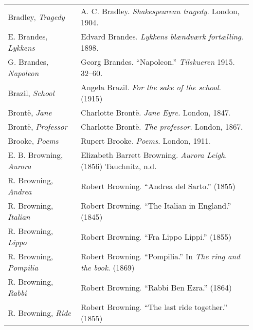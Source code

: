 \begin{longtable}{p{} p{}}
Bradley, \textit{Tragedy} & A. C. Bradley. \textit{Shakespearean tragedy}. London, 1904. \\

E. Brandes, \textit{Lykkens} & Edvard Brandes. \textit{Lykkens blændværk fortælling}. 1898. \\

G. Brandes, \textit{Napoleon} & Georg Brandes. ``Napoleon.'' \textit{Tilskueren} 1915. 32--60. \\ %

Brazil, \textit{School} & Angela Brazil. \textit{For the sake of the school}. (1915) \\
%

Brontë, \textit{Jane} & Charlotte Brontë. \textit{Jane Eyre}. London, 1847. \\
Brontë, \textit{Professor} & Charlotte Brontë. \textit{The professor}. London, 1867. \\

Brooke, \textit{Poems} & Rupert Brooke. \textit{Poems}. London, 1911. \\ 

E. B. Browning, \textit{Aurora} & Elizabeth Barrett Browning. \textit{Aurora Leigh}. (1856) Tauchnitz, n.d. \\ %

R. Browning, \textit{Andrea} & Robert Browning. ``Andrea del Sarto.'' (1855) \\
R. Browning, \textit{Italian} & Robert Browning. ``The Italian in England.'' (1845) \\
R. Browning, \textit{Lippo} & Robert Browning. ``Fra Lippo Lippi.'' (1855) \\
R. Browning, \textit{Pompilia} & Robert Browning. ``Pompilia.'' In \textit{The ring and the book}. (1869) \\
R. Browning, \textit{Rabbi} & Robert Browning. ``Rabbi Ben Ezra.'' (1864) \\
R. Browning, \textit{Ride} & Robert Browning. ``The last ride together.'' (1855) \\
%


\end{longtable}
